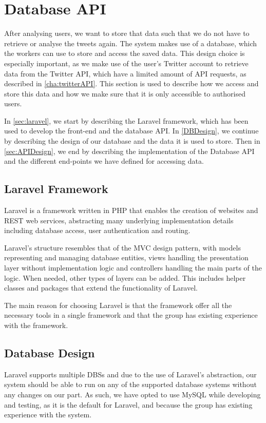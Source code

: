 \chapter{Database \acs{API}}\label{DatabaseAPI}
After analysing users, we want to store that data such that we do not have to
retrieve or analyse the tweets again. The system makes use of a
database, which the workers can use to store and access the saved data. This
design choice is especially important, as we make use of the user's Twitter
account to retrieve data from the Twitter \ac{API}, which have a limited amount
of API requests, as described in \autoref{cha:twitterAPI}. This section
is used to describe how we access and store this data and how we make sure that
it is only accessible to authorised users.\nl

In \autoref{sec:laravel}, we start by describing the Laravel framework, which
has been used to develop the front-end and the database \ac{API}. In
\autoref{DBDesign}, we continue by describing the design of our database and the
data it is used to store. Then in \autoref{sec:APIDesign}, we end by describing
the implementation of the Database \ac{API} and the different end-points we
have defined for accessing data.

\section{Laravel Framework}\label{sec:laravel}
Laravel is a framework written in PHP that enables the creation of websites and
\ac{REST} web services, abstracting many underlying implementation details
including database access, user authentication and routing.\nl

Laravel's structure resembles that of the \ac{MVC} design pattern, with models
representing and managing database entities, views handling the presentation
layer without implementation logic and controllers handling the main parts of
the logic. When needed, other types of layers can be added. This
includes helper classes and packages that extend the functionality of
Laravel.\nl

The main reason for choosing Laravel is that the framework offer all the
necessary tools in a single framework and that the group has existing
experience with the framework.
% 
% 

\section{Database Design}\label{DBDesign}
Laravel supports multiple \acp{DBS} \citep{LaravelDBS} and due to the use of
Laravel's abstraction, our system should be able to run on any of the supported
database systems without any changes on our part. As such, we have opted to use
MySQL while developing and testing, as it is the default for Laravel, and
because the group has existing experience with the system.\nl

